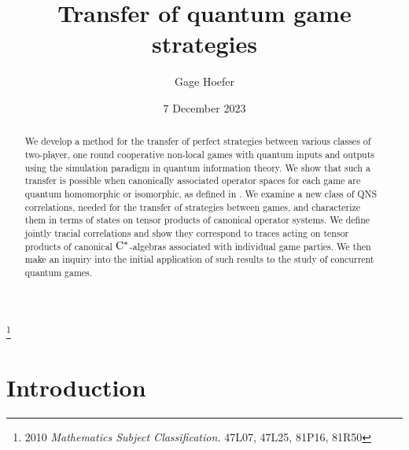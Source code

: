 \documentclass[11pt]{amsart}
\begin{document}
\title[Transfer of quantum game strategies]
{Transfer of quantum game strategies}




\author[G. Hoefer]{Gage Hoefer}
\address{Department of Mathematical Sciences\\ University of Delaware\\ 501 Ewing Hall\\ Newark\\ DE 19716\\ USA}




\date{7 December 2023}

\thanks{2010 {\it  Mathematics Subject Classification.} 47L07, 47L25, 81P16, 81R50}


\begin{abstract} 
We develop a method for the transfer of perfect strategies between various classes of two-player, one round cooperative non-local games with quantum inputs and outputs using the simulation paradigm in quantum information theory. We show that such a transfer is possible when canonically associated operator spaces for each game are quantum homomorphic or isomorphic, as defined in \cite{gt_two}. We examine a new class of QNS correlations, needed for the transfer of strategies between games, and characterize them in terms of states on tensor products of canonical operator systems. We define jointly tracial correlations and show they correspond to traces acting on tensor products of canonical ${\rm C}^{*}$-algebras associated with individual game parties. We then make an inquiry into the initial application of such results to the study of concurrent quantum games. 
\end{abstract} 


\maketitle

\tableofcontents


\section{Introduction}\label{s_intro}
\end{document}
